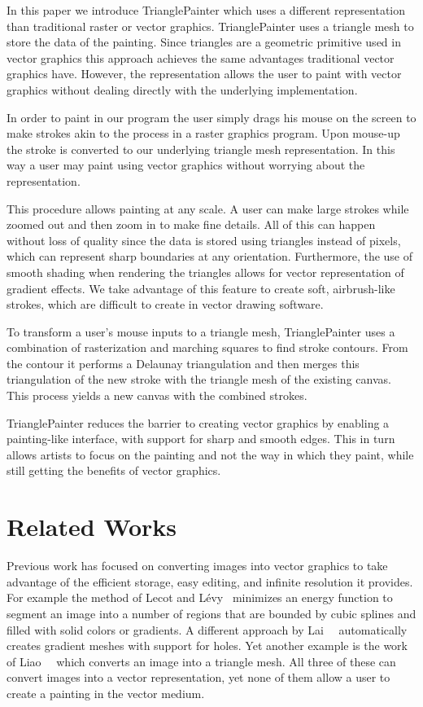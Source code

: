 \documentclass[review]{acmsiggraph}
\begin{document}
In this paper we introduce TrianglePainter which  
uses a different representation than traditional raster or vector graphics.
TrianglePainter uses a triangle mesh to store the data of the painting.
Since triangles are a geometric primitive used in vector graphics this approach achieves the
same advantages traditional vector graphics have. However, the representation allows the
user to paint with vector graphics without dealing directly with the underlying implementation.

In order to paint in our program the user simply drags his mouse on the screen to make
strokes akin to the process in a raster graphics program. Upon mouse-up the stroke is
converted to our underlying triangle mesh representation. In this way a user may paint using
vector graphics without worrying about the representation.

This procedure allows painting at any scale. A user can make large strokes
while zoomed out and then zoom in to make fine details. All of this can happen without
loss of quality since the data is stored using triangles instead of pixels, which can represent sharp boundaries at any orientation.  Furthermore, the use of smooth shading when rendering the triangles allows for vector representation of gradient effects.  We take advantage of this feature to create soft, airbrush-like strokes, which are difficult to create in vector drawing software.

To transform a user's mouse inputs to a triangle mesh,
TrianglePainter uses a combination of rasterization and marching squares to
find stroke contours. From the contour it performs a Delaunay triangulation
and then merges this triangulation
of the new stroke with the triangle mesh of the existing canvas. This process yields
a new canvas with the combined strokes.

TrianglePainter reduces the barrier to creating vector graphics by enabling a painting-like interface, with support for sharp and smooth edges. This in turn allows 
artists to focus on the painting and not the way in which they paint, while still 
getting the benefits of vector graphics.

\section{Related Works}

Previous work has focused on converting images into vector graphics to take advantage of the
efficient storage, easy editing, and infinite resolution it provides. For example the method of
Lecot and L\'{e}vy~
minimizes an energy function to segment an image into a number of regions that are bounded
by cubic splines and filled with solid colors or gradients. A different approach by Lai~\etal~ 
automatically creates gradient meshes with support for holes. Yet another example is the work of Liao~\etal~ 
which converts an image into a triangle mesh. All three of these can convert images into
a vector representation, yet none of them allow a user to create a painting in the vector medium.
\end{document}

